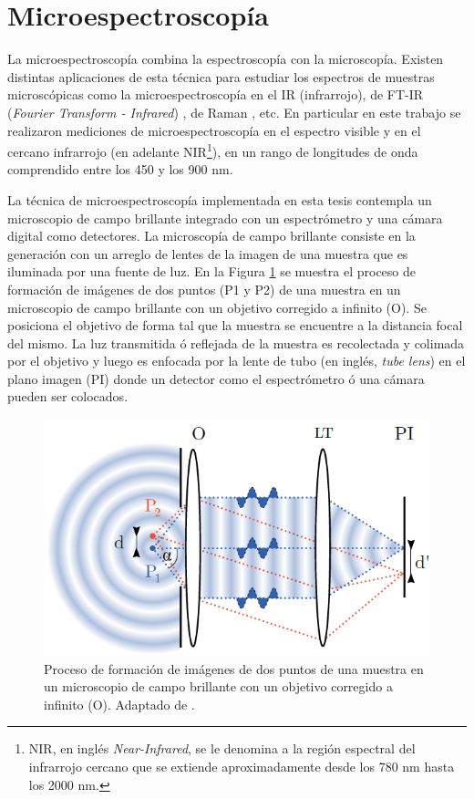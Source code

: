 \singlespacing
\section{Microespectroscopía}
\label{sec:microespp}


\hspace{0.5cm}La microespectroscopía combina la espectroscopía con la microscopía. Existen distintas aplicaciones de esta técnica para estudiar los espectros de muestras microscópicas como la microespectroscopía en el IR (infrarrojo)\cite{WALSH20071}, de FT-IR (\textit{Fourier Transform - Infrared}) \cite{kani}, de Raman \cite{defaria}, etc. En particular en este trabajo se realizaron mediciones de microespectroscopía en el espectro visible y en el cercano infrarrojo (en adelante NIR\footnote{NIR, en inglés \textit{Near-Infrared}, se le denomina a la región espectral del infrarrojo cercano que se extiende aproximadamente desde los 780 nm hasta los 2000 nm.}), en un rango de longitudes de onda comprendido entre los 450 y los 900 nm.

La técnica de microespectroscopía implementada en esta tesis contempla un microscopio de campo brillante integrado con un espectrómetro y una cámara digital como detectores. La microscopía de campo brillante consiste en la generación con un arreglo de lentes de la imagen de una muestra que es iluminada por una fuente de luz. En la Figura \ref{fig:mdb} se muestra el proceso de formación de imágenes de dos puntos (P1 y P2) de una muestra en un microscopio de campo brillante con un objetivo corregido a infinito (O). Se posiciona el objetivo de forma tal que la muestra se encuentre a la distancia focal del mismo. La luz transmitida ó reflejada de la muestra es recolectada y colimada por el objetivo y luego es enfocada por la lente de tubo (en inglés, \textit{tube lens}) en el plano imagen (PI) donde un detector como el espectrómetro ó una cámara pueden ser colocados.

\begin{figure}[H]
	\centering
	\includegraphics[width=1.0\textwidth]{Figs/introduccion/martinbordenave.png}
	\caption{Proceso de formación de imágenes de dos puntos de una muestra en un microscopio de campo brillante con un objetivo corregido a infinito (O). Adaptado de \cite{borden}.}
	\label{fig:mdb}
\end{figure}


